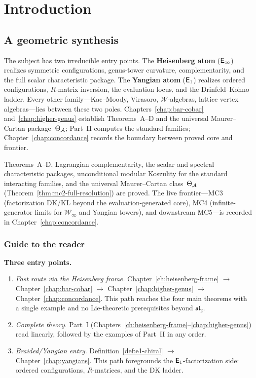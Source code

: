 \chapter{Introduction}

\section{A geometric synthesis}
\label{sec:volume-one-route}

The subject has two irreducible entry points.  The \textbf{Heisenberg atom} ($\mathsf{E}_{\infty}$) realizes symmetric configurations, genus-tower curvature, complementarity, and the full scalar characteristic package.  The \textbf{Yangian atom} ($\mathsf{E}_1$) realizes ordered configurations, $R$-matrix inversion, the evaluation locus, and the Drinfeld--Kohno ladder.  Every other family---Kac--Moody, Virasoro, $\mathcal{W}$-algebras, lattice vertex algebras---lies between these two poles.  Chapters~\ref{chap:bar-cobar} and~\ref{chap:higher-genus} establish Theorems~A--D and the universal Maurer--Cartan package~$\Theta_{\mathcal{A}}$; Part~II computes the standard families; Chapter~\ref{chap:concordance} records the boundary between proved core and frontier.

Theorems~A--D, Lagrangian complementarity, the scalar and spectral
characteristic packages, unconditional modular Koszulity for the
standard interacting families, and the universal Maurer--Cartan
class~$\Theta_{\mathcal{A}}$
(Theorem~\ref{thm:mc2-full-resolution}) are proved.%
\label{rem:two-strata}
The live frontier---MC3 (factorization DK/KL beyond the
evaluation-generated core), MC4 (infinite-generator limits for
$\mathcal{W}_\infty$ and Yangian towers), and downstream
MC5---is recorded in Chapter~\ref{chap:concordance}.

\subsection*{Guide to the reader}
\label{subsec:guide-to-reader}

\noindent\textbf{Three entry points.}
\begin{enumerate}[label=\textup{(\alph*)}]
\item \emph{Fast route via the Heisenberg frame.}
  Chapter~\ref{ch:heisenberg-frame} $\to$
  Chapter~\ref{chap:bar-cobar} $\to$
  Chapter~\ref{chap:higher-genus} $\to$
  Chapter~\ref{chap:concordance}.
  This path reaches the four main theorems with a single
  example and no Lie-theoretic prerequisites beyond $\mathfrak{sl}_2$.
\item \emph{Complete theory.}
  Part~I (Chapters~\ref{ch:heisenberg-frame}--\ref{chap:higher-genus})
  read linearly,
  followed by the examples of Part~II in any order.
\item \emph{Braided/Yangian entry.}
  Definition~\ref{def:e1-chiral} $\to$
  Chapter~\ref{chap:yangians}.
  This path foregrounds the $\mathsf{E}_1$-factorization side:
  ordered configurations, $R$-matrices, and the DK ladder.
\end{enumerate}

